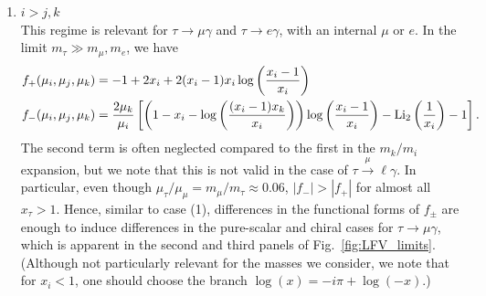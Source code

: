 {\begin{enumerate}
    \item $i > j,k$\\
    This regime is relevant for $\tau \rightarrow \mu \gamma$ and $\tau \rightarrow e\gamma$, with an internal $\mu$ or $e$. In the limit $m_\tau \gg m_\mu, m_e$, we have
    \begin{align}
    f_+(\mu_i, \mu_j, \mu_k) &= -1+2x_i + 2(x_i - 1)x_i \log\left(\frac{x_i - 1}{x_i}\right)\nonumber\\
    f_-(\mu_i, \mu_j, \mu_k) &= \frac{2\mu_k}{\mu_i}\left[ \left(1 - x_i -\log\left(\frac{(x_i-1)x_k}{x_i}\right)\right)\log\left(\frac{x_i-1}{x_i}\right) - {\rm Li}_2\left(\frac{1}{x_i}\right) - 1\right].
    \end{align}
    The second term is often neglected compared to the first in the $m_k / m_i$ expansion, but we note that this is not valid in the case of $\tau \overset{\mu}{\longrightarrow} \ell\gamma$. In particular, even though $\mu_\tau/\mu_\mu = m_\mu/m_\tau \approx 0.06$, $|f_-| > |f_+|$ for almost all $x_\tau > 1$. Hence, similar to case (1), differences in the functional forms of $f_{\pm}$ are enough to induce differences in the pure-scalar and chiral cases for $\tau\rightarrow\mu\gamma$, which is apparent in the second and third panels of Fig.~\ref{fig:LFV_limits}. (Although not particularly relevant for the masses we consider, we note that for $x_i < 1$, one should choose the branch $\log{(x)} = -i\pi + \log{(-x)}$.)
    

\end{enumerate}}
